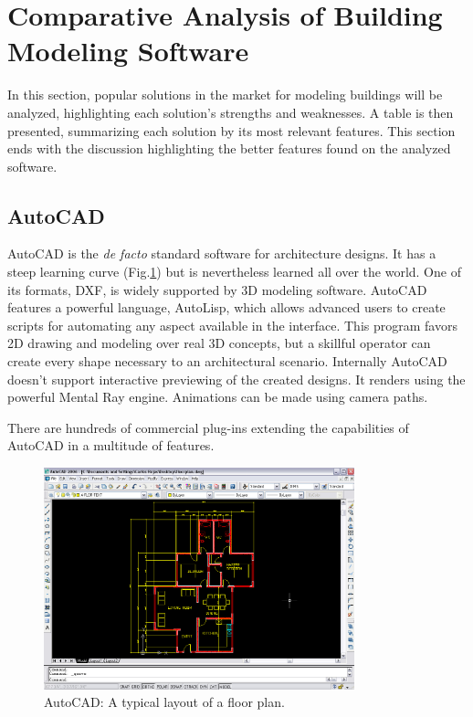 \section{Comparative Analysis of Building Modeling Software}

In this section, popular solutions in the market for modeling buildings will be analyzed,
highlighting each solution's strengths and weaknesses.
A table is then presented, summarizing each solution by its most relevant features.
This section ends with the discussion highlighting the better features found on the analyzed software.

\subsection{AutoCAD}
AutoCAD \cite{SITE-AUTOCAD} is the \emph{de facto} standard software for architecture designs.
It has a steep learning curve (Fig.\ref{FIG-AUTOCAD}) but is nevertheless
learned all over the world.
One of its formats, DXF, is widely supported by 3D modeling software.
AutoCAD features a powerful language, AutoLisp, which allows advanced users to create scripts for
automating any aspect available in the interface.
This program favors 2D drawing and modeling over real 3D concepts,
but a skillful operator can create every shape necessary to an architectural scenario.
Internally AutoCAD doesn't support interactive previewing of the created designs.
It renders using the powerful Mental Ray engine.
Animations can be made using camera paths.

There are hundreds of commercial plug-ins extending the capabilities of AutoCAD in a multitude of features.

\begin{figure}[!ht]
    \centering
    \includegraphics[width=9cm]{gfx/autocad-1.png}
    \caption{AutoCAD: A typical layout of a floor plan.}
    \label{FIG-AUTOCAD}
\end{figure}

